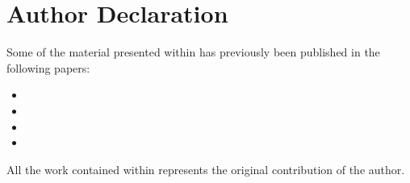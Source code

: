 \chapter*{Author Declaration}
Some of the material presented within has previously been published in the
following papers:

\begin{itemize}
  \item {}
  \item {}
  \item {}
  \item {}
\end{itemize}

\flushleft
All the work contained within represents the original contribution of the
author.